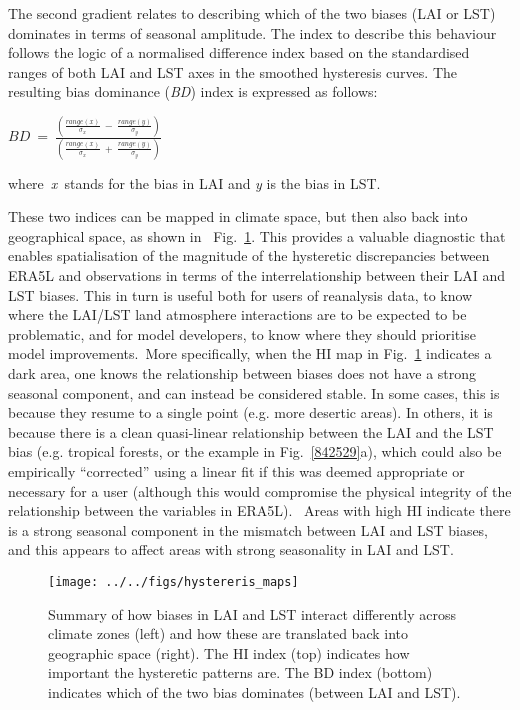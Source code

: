\documentclass[gmd, manuscript]{copernicus}
\begin{document}
{The second gradient relates to
describing which of the two biases (LAI or LST) dominates in terms of
seasonal amplitude. The index to describe this behaviour follows the
logic of a normalised difference index based on the standardised ranges
of both LAI and LST axes in the smoothed hysteresis curves. The
resulting bias dominance (\emph{BD}) index is expressed as follows:

\(BD\ =\ \frac{\left(\frac{range\left(x\right)}{\sigma_x}\ -\ 
\frac{range\left(y\right)}{\sigma_y}\right)}{\left(\frac{range\left(x\right)}{\sigma_x}\ 
+\ 
\frac{range\left(y\right)}{\sigma_y}\right)}\)

where~\emph{x~}stands 
for the bias in LAI and \emph{y} is the bias in
LST.

{These two indices can be mapped in climate space, but then also back
into geographical space, as shown in~
Fig.~}{\ref{988186}}{.} This provides a valuable
diagnostic that enables spatialisation of the magnitude of the
hysteretic discrepancies between ERA5L and observations in terms of the
interrelationship between their LAI and LST biases. This in turn is
useful both for users of reanalysis data, to know where the LAI/LST land
atmosphere interactions are to be expected to be problematic, and for
model developers, to know where they should prioritise model
improvements.~{{More specifically, when the HI map in
Fig.~}}{\ref{988186}}{ indicates a dark area, one knows
the relationship between biases does not have a strong seasonal
component}, and can instead be considered stable. In some cases, this is
because they resume to a single point (e.g. more desertic areas). In
others, it is because there is a clean quasi-linear relationship between
the LAI and the LST bias (e.g. tropical forests, or the example in
Fig.~{\ref{842529}}a), which could also be empirically
``corrected'' using a linear fit if this was deemed appropriate or
necessary for a user (although this would compromise the physical
integrity of the relationship between the variables in ERA5L).~ Areas
with high HI indicate there is a strong seasonal component in the
mismatch between LAI and LST biases, and this appears to affect areas
with strong seasonality in LAI and LST.

\par\null\selectlanguage{english}
\begin{figure}[H]
\begin{center}
\texttt{[image: ../../figs/hystereris\_maps]}
\caption{{{Summary of how biases in LAI and LST interact} differently across
climate zones (left) and how these are translated back into geographic
space (right). {The HI index (top) indicates how important the
hysteretic patterns are. The BD index (bottom) indicates which of the
two bias dominates (between LAI and LST).}~
{\label{988186}}%
}}
\end{center}
\end{figure}

}
\end{document}
